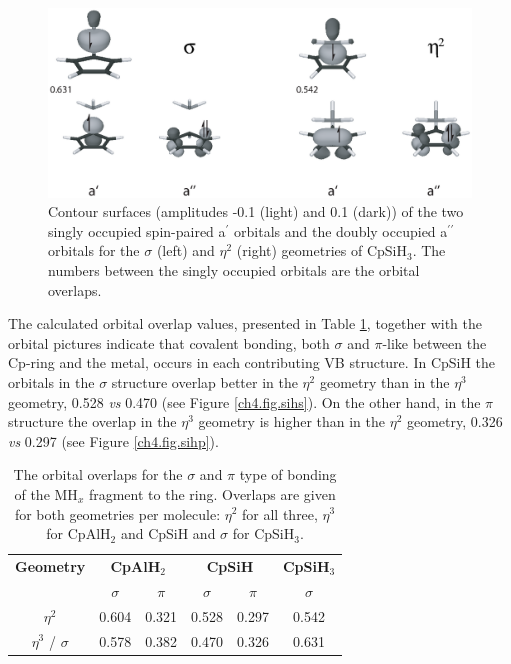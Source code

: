 \begin{figure} [htbp]
\begin{center}
\includegraphics[scale=0.67]{cyclopentadienyl/figures/sih3_sigma.eps}
\end{center}
\caption{Contour surfaces (amplitudes -0.1 (light) and 0.1 (dark)) of the two singly occupied spin-paired a$^\prime$ orbitals and the doubly occupied a$^{\prime\prime}$ orbitals for the $\sigma$ (left) and $\eta^{2}$ (right) geometries of CpSiH$_3$. The numbers between the singly occupied orbitals are the orbital overlaps.}
\label{ch4.fig.sih3}
\end{figure}

The calculated orbital overlap values, presented in Table \ref{ch4.tab.overlaps}, together with the orbital pictures indicate that covalent bonding, both $\sigma$ and $\pi$-like between the Cp-ring and the metal, occurs in each contributing VB structure. In CpSiH the orbitals in the $\sigma$ structure overlap better in the $\eta^2$ geometry than in the $\eta^3$ geometry, 0.528 \textit{vs} 0.470 (see Figure \ref{ch4.fig.sihs}). On the other hand, in the $\pi$ structure the overlap in the $\eta^{3}$ geometry is higher than in the $\eta^{2}$ geometry, 0.326 \textit{vs} 0.297 (see Figure \ref{ch4.fig.sihp}).
\begin{table}[hbtp]
\caption{The orbital overlaps for the $\sigma$ and $\pi$ type of bonding of the MH$_x$ fragment to the ring. Overlaps are given for both geometries per molecule: $\eta^2$ for all three, $\eta^3$ for CpAlH$_2$ and CpSiH and $\sigma$ for CpSiH$_3$.}
\center
\begin{tabular}{|c|cc|cc|c|}
\hline
\textbf{Geometry}&
\multicolumn{2}{c|}{\textbf{CpAlH$_2$}}&
\multicolumn{2}{c|}{\textbf{CpSiH}}&
\textbf{CpSiH$_3$}\\
&
$\sigma$&
$\pi$&
$\sigma$&
$\pi$&
$\sigma$\\
\hline
$\eta^{2}$& 0.604 & 0.321 & 0.528 & 0.297 & 0.542 \\
$\eta^{3}$ / $\sigma$ & 0.578 & 0.382 & 0.470 & 0.326 & 0.631 \\
\hline
\end{tabular}
\label{ch4.tab.overlaps}
\end{table}


